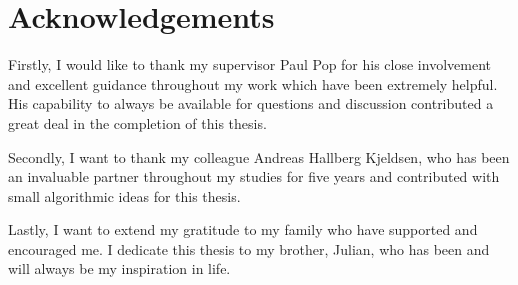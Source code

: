 \chapter{Acknowledgements}

Firstly, I would like to thank my supervisor Paul Pop for his close involvement and excellent guidance throughout my work which have been extremely helpful. His capability to always be available for questions and discussion contributed a great deal in the completion of this thesis.

Secondly, I want to thank my colleague Andreas Hallberg Kjeldsen, who has been an invaluable partner throughout my studies for five years and contributed with small algorithmic ideas for this thesis.

Lastly, I want to extend my gratitude to my family who have supported and encouraged me. I dedicate this thesis to my brother, Julian, who has been and will always be my inspiration in life.